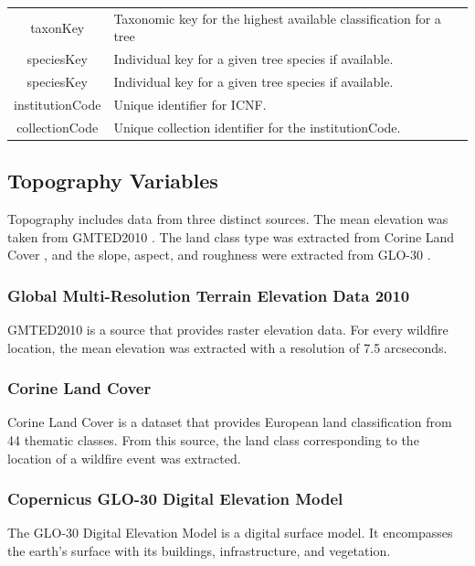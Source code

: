 \begin{table}[H]
\begin{tabular}{cp{7.5cm}}
		taxonKey & Taxonomic key for the highest available classification for a tree \\
		
		speciesKey & Individual key for a given tree species if available. \\
		
		speciesKey & Individual key for a given tree species if available. \\
		
		institutionCode & Unique identifier for ICNF. \\
		
		collectionCode & Unique collection identifier for the institutionCode. \\
	\end{tabular}
\end{table}


\subsection{Topography Variables}
Topography includes data from three distinct sources. The mean elevation was taken from GMTED2010 \cite{Danielson2011}. The land class type was extracted from Corine Land Cover \cite{71c95a07-e296-44fc-b22b-415f42acfdf0}, and the slope, aspect, and roughness were extracted from GLO-30 \cite{ESA_Sinergise_2021}.

\subsubsection{Global Multi-Resolution Terrain Elevation Data 2010 \cite{Danielson2011}}
GMTED2010 is a source that provides raster elevation data. For every wildfire location, the mean elevation was extracted with a resolution of 7.5 arcseconds. 

\subsubsection{Corine Land Cover \cite{71c95a07-e296-44fc-b22b-415f42acfdf0}}
Corine Land Cover is a dataset that provides European land classification from 44 thematic classes. From this source, the land class corresponding to the location of a wildfire event was extracted.

\subsubsection{Copernicus GLO-30 Digital Elevation Model \cite{ESA_Sinergise_2021}}
The GLO-30 Digital Elevation Model is a digital surface model. It encompasses the earth's surface with its buildings, infrastructure, and vegetation.

